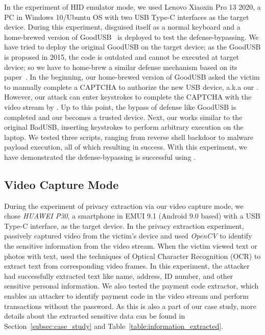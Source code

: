 In the experiment of HID emulator mode, we used {Lenovo Xiaoxin Pro 13
2020}, a PC in Windows 10/Ubuntu OS with two USB Type-C interfaces as the
target device.  During this experiment, \tool disguised itself as a normal
keyboard and a home-brewed version of GoodUSB~\cite{tian2015defending} is
deployed to test the defense-bypassing. We have tried to deploy the original
GoodUSB on the target device; as the GoodUSB is proposed in 2015, the code is
outdated and cannot be executed at target device; so we have to home-brew a similar
defense mechanism based on its paper~\cite{tian2015defending}.  In the
beginning, our home-brewed version of GoodUSB asked the victim to manually complete
a CAPTCHA to authorize the new USB device, a.k.a our \tool.
However, our attack can enter keystrokes to complete the
CAPTCHA with the video stream by \tool. Up
to this point, the bypass of defense like GoodUSB is completed and our \tool
becomes a trusted device. Next, our
\tool works similar to the original BadUSB, inserting keystrokes to perform
arbitrary execution on the laptop. We tested three scripts, ranging from
reverse shell backdoor to malware payload execution, all of which resulting in
success. With this experiment, we have demonstrated the defense-bypassing is successful
using \tool.


\subsection{Video Capture Mode}

During the experiment of privacy extraction via our video capture mode, we chose \textit{HUAWEI P30}, a
smartphone in EMUI 9.1 (Android 9.0 based) with a USB Type-C interface, as the
target device.  In the privacy extraction experiment, \tool passively captured video
from the victim's device and used \textit{OpenCV} to identify the sensitive
information from the video stream.  When the victim viewed text or photos with
text, \tool used the techniques of Optical Character Recognition (OCR)  to
extract text from corresponding video frames. In this experiment, the attacker had
successfully extracted text like name, address, ID number, and other sensitive
personal information. We also tested the payment code extractor, which enables
an attacker to identify payment code in the video stream and perform transactions
without the password. As this is also a part of our case study, more details about
the extracted sensitive data can be found in Section~\ref{subsec:case_study} and
Table~\ref{table:information_extracted}.

